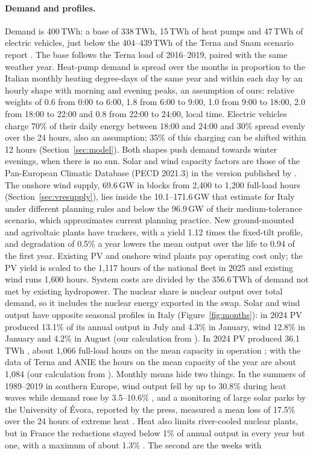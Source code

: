 \paragraph{Demand and profiles.} Demand is 400\,TWh: a base of 338\,TWh, 15\,TWh of heat pumps and 47\,TWh of electric vehicles, just below the 404--439\,TWh of the Terna and Snam scenario report \citep{DDS2024}. The base follows the Terna load of 2016--2019, paired with the same weather year. Heat-pump demand is spread over the months in proportion to the Italian monthly heating degree-days of the same year \citep{EurostatHDD} and within each day by an hourly shape with morning and evening peaks, an assumption of ours: relative weights of 0.6 from 0:00 to 6:00, 1.8 from 6:00 to 9:00, 1.0 from 9:00 to 18:00, 2.0 from 18:00 to 22:00 and 0.8 from 22:00 to 24:00, local time. Electric vehicles charge 70\% of their daily energy between 18:00 and 24:00 and 30\% spread evenly over the 24 hours, also an assumption; 35\% of this charging can be shifted within 12 hours (Section~\ref{sec:model}). Both shapes push demand towards winter evenings, when there is no sun. Solar and wind capacity factors are those of the Pan-European Climatic Database (PECD 2021.3) in the version published by \citet{PECD2021}. The onshore wind supply, 69.6\,GW in blocks from 2{,}400 to 1{,}200 full-load hours (Section~\ref{sec:vresupply}), lies inside the 10.1--171.6\,GW that \citet{Price2026} estimate for Italy under different planning rules and below the 96.9\,GW of their medium-tolerance scenario, which approximates current planning practice. New ground-mounted and agrivoltaic plants have trackers, with a yield 1.12 times the fixed-tilt profile, and degradation of 0.5\% a year lowers the mean output over the life to 0.94 of the first year. Existing PV and onshore wind plants pay operating cost only; the PV yield is scaled to the 1{,}117 hours of the national fleet in 2025 \citep{GSEPV2025} and existing wind runs 1{,}600 hours. System costs are divided by the 356.6\,TWh of demand not met by existing hydropower. The nuclear share is nuclear output over total demand, so it includes the nuclear energy exported in the swap. Solar and wind output have opposite seasonal profiles in Italy (Figure~\ref{fig:months}): in 2024 PV produced 13.1\% of its annual output in July and 4.3\% in January, wind 12.8\% in January and 4.2\% in August (our calculation from \citealp{TernaMonthly2024}). In 2024 PV produced 36.1\,TWh \citep{TernaMonthly2024}, about 1{,}066 full-load hours on the mean capacity in operation \citep{GSEPV2024}; with the data of Terna and ANIE the hours on the mean capacity of the year are about 1{,}084 (our calculation from \citealp{TernaMonthly2024,ANIE2025}). Monthly means hide two things. In the summers of 1989--2019 in southern Europe, wind output fell by up to 30.8\% during heat waves while demand rose by 3.5--10.6\% \citep{Molina2023}, and a monitoring of large solar parks by the University of \'Evora, reported by the press, measured a mean loss of 17.5\% over the 24 hours of extreme heat \citep{MoneyEvora2026}. Heat also limits river-cooled nuclear plants, but in France the reductions stayed below 1\% of annual output in every year but one, with a maximum of about 1.3\% \citep{DeGroote2026}. The second are the weeks with 